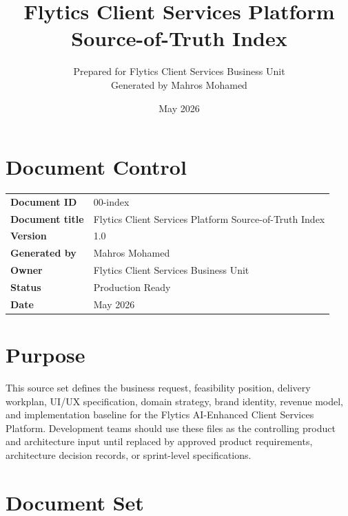 \documentclass[11pt,a4paper]{article}
\title{\textbf{Flytics Client Services Platform\\Source-of-Truth Index}}
\author{Prepared for Flytics Client Services Business Unit\\Generated by Mahros Mohamed}
\date{May 2026}
\begin{document}
\maketitle
\section*{Document Control}
\begin{longtable}{>{\bfseries}p{}p{}}
\toprule
Document ID & 00-index \\
Document title & Flytics Client Services Platform Source-of-Truth Index \\
Version & 1.0 \\
Generated by & Mahros Mohamed \\
Owner & Flytics Client Services Business Unit \\
Status & Production Ready \\
Date & May 2026 \\
\bottomrule
\end{longtable}

\renewcommand{\contentsname}{Contents}
\tableofcontents
\newpage

\section*{Purpose}

This source set defines the business request, feasibility position, delivery workplan, UI/UX specification, domain strategy, brand identity, revenue model, and implementation baseline for the Flytics AI-Enhanced Client Services Platform. Development teams should use these files as the controlling product and architecture input until replaced by approved product requirements, architecture decision records, or sprint-level specifications.

\section{Document Set}
\end{document}
